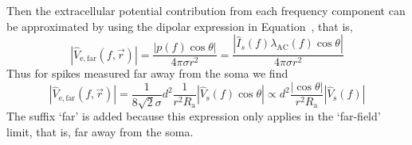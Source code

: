 Then the extracellular potential contribution from each frequency component can be approximated by using the 
dipolar expression in Equation~, that is,
\begin{equation}
  |\hat{V}_\mathrm{e,far}(f,\vec{r})| =  \frac{|p(f) \cos \theta|}{4 \pi \sigma r^2} 
                                            = \frac{| \hat{I}_{s}(f) \lambda_\mathrm{AC}(f) \cos \theta|}{4 \pi \sigma r^2}   
                                                                                        \label{eq:Spikes:Ve_far_1}
\end{equation}
Thus for spikes measured far away from the soma we find 
%  
\begin{equation}
  |\hat{V}_\mathrm{e,far}(f,\vec{r})|  = \frac{1}{8 \sqrt{2} \sigma} d^{2} \frac{1}{r^2  R_\mathrm{a}} 
      |\hat{V}_\mathrm{s}(f) \cos \theta | 
  \propto d^{2} \frac{|\cos \theta|}{r^2  R_\mathrm{a}} |\hat{V}_\mathrm{s}(f)| 
  \label{eq:Spikes:Ve_far_2}
\end{equation}
The suffix `far' is added because this expression only applies in the `far-field' limit, that is,
far away from the soma. 
%








